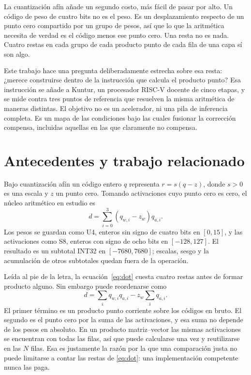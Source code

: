 La cuantización afín añade un segundo costo, más fácil de pasar por alto. Un
código de peso de cuatro bits no es el peso. Es un desplazamiento respecto de un
punto cero compartido por un grupo de pesos, así que lo que la aritmética
necesita de verdad es el código menos ese punto cero. Una resta no es nada.
Cuatro restas en cada grupo de cada producto punto de cada fila de una capa sí
son algo.

Este trabajo hace una pregunta deliberadamente estrecha sobre esa resta: ¿merece
construirse dentro de la instrucción que calcula el producto punto? Esa
instrucción se añade a Kuntur, un procesador RISC-V docente de cinco etapas, y
se mide contra tres puntos de referencia que resuelven la misma aritmética de
maneras distintas. El objetivo no es un acelerador, ni una pila de inferencia
completa. Es un mapa de las condiciones bajo las cuales fusionar la corrección
compensa, incluidas aquellas en las que claramente no compensa.



\section{Antecedentes y trabajo relacionado}
Bajo cuantización afín un código entero \(q\) representa \(r=s(q-z)\), donde
\(s>0\) es una escala y \(z\) un punto cero. Tomando activaciones cuyo punto
cero es cero, el núcleo aritmético en estudio es
\begin{equation}
d=\sum_{i=0}^{3}(q_{w,i}-z_w)q_{a,i}.
\label{eq:dot}
\end{equation}
Los pesos se guardan como U4, enteros sin signo de cuatro bits en \([0,15]\), y
las activaciones como S8, enteros con signo de ocho bits en \([-128,127]\). El
resultado es un subtotal INT32 en \([-7680,7680]\); escalas, sesgo y la
acumulación de otros subtotales quedan fuera de la operación.

Leída al pie de la letra, la ecuación~\eqref{eq:dot} cuesta cuatro restas antes
de formar
producto alguno. Sin embargo puede reordenarse como
\begin{equation}
d=\sum_i q_{w,i}q_{a,i}-z_w\sum_i q_{a,i}.
\label{eq:factor}
\end{equation}
El primer término es un producto punto corriente sobre los códigos en bruto. El
segundo es el punto cero por la suma de las activaciones, y esa suma no depende
de los pesos en absoluto. En un producto matriz--vector las mismas activaciones
se encuentran con todas las filas, así que puede calcularse una vez y
reutilizarse en las \(N\) filas. Esa es justamente la razón por la que una
comparación justa no puede limitarse a contar las restas de \eqref{eq:dot}:
una implementación competente nunca las paga.

